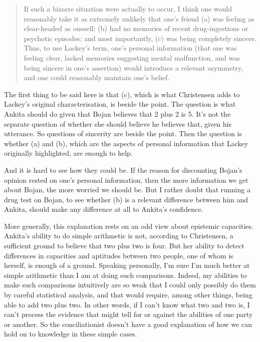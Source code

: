 \documentclass[
  10pt,
  letterpaper,
  twoside]{scrbook}
\begin{document}
\begin{quote}
If such a bizarre situation were actually to occur, I think one would
reasonably take it as extremely unlikely that one's friend (a) was
feeling as clear-headed as oneself; (b) had no memories of recent
drug-ingestions or psychotic episodes; and most importantly, (c) was
being completely sincere. Thus, to use Lackey's term, one's personal
information (that one was feeling clear, lacked memories suggesting
mental malfunction, and was being sincere in one's assertion) would
introduce a relevant asymmetry, and one could reasonably maintain one's
belief.
\end{quote}

The first thing to be said here is that (c), which is what Christensen
adds to Lackey's original characterisation, is beside the point. The
question is what {Ankita} should do given that {Bojan} believes that 2
plus 2 is 5. It's not the separate question of whether she should
believe he believes that, given his utterance. So questions of sincerity
are beside the point. Then the question is whether (a) and (b), which
are the aspects of personal information that Lackey originally
highlighted, are enough to help.

And it is hard to see how they could be. If the reason for discounting
{Bojan}'s opinion rested on one's personal information, then the more
information we get about {Bojan}, the more worried we should be. But I
rather doubt that running a drug test on {Bojan}, to see whether (b) is
a relevant difference between him and {Ankita}, should make any
difference at all to {Ankita}'s confidence.

More generally, this explanation rests on an odd view about epistemic
capacities. {Ankita}'s ability to do simple arithmetic is not, according
to Christensen, a sufficient ground to believe that two plus two is
four. But her ability to detect differences in capacities and aptitudes
between two people, one of whom is herself, is enough of a ground.
Speaking personally, I'm sure I'm much better at simple arithmetic than
I am at doing such comparisons. Indeed, my abilities to make such
comparisons intuitively are so weak that I could only possibly do them
by careful statistical analysis, and that would require, among other
things, being able to add two plus two. In other words, if I can't know
what two and two is, I can't process the evidence that might tell for or
against the abilities of one party or another. So the conciliationist
doesn't have a good explanation of how we can hold on to knowledge in
these simple cases.
\end{document}
